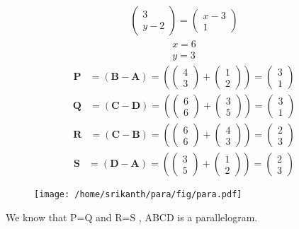 \documentclass[12pt]{article}
\providecommand{\brak}[1]{\ensuremath{\left(#1\right)}}
\newcommand{\myvec}[1]{\ensuremath{\begin{pmatrix}#1\end{pmatrix}}}
\let\vec\mathbf
\begin{document}
 \begin{align} 
 \myvec{3\\y-2}=\myvec{x-3\\1}
 \end{align}
 \begin{align} 
   x=6 \\ y=3
 \end{align}
 \begin{align}
 \vec{P} &= \brak{\vec{B}-\vec{A}} = \brak{\myvec{4 \\3 } + \myvec{ 1 \\2} } = \myvec{3\\1}  
 \end{align}
 \begin{align}
 \vec{Q} &= \brak{\vec{C}-\vec{D}} = \brak{\myvec{6 \\6 } + \myvec{ 3 \\5} } = \myvec{3\\1}
 \end{align}
 \begin{align}
 \vec{R} &= \brak{\vec{C}-\vec{B}} = \brak{\myvec{6 \\6 } + \myvec{ 4 \\ 3} } = \myvec{2\\3} 
 \end{align}
 \begin{align}
 \vec{S} &= \brak{\vec{D}-\vec{A}} = \brak{\myvec{3 \\5 } + \myvec{1 \\2} } = \myvec{2\\3} 
\end{align}
\begin{figure}[h!]
	\begin{center}
  \texttt{[image: /home/srikanth/para/fig/para.pdf]}
	\end{center}
\caption{}
\label{fig:Fig3}
\end{figure}
We know that P=Q and R=S , ABCD is a parallelogram. 
\end{document}
